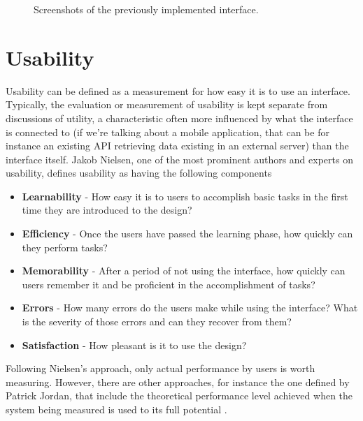 \begin{figure}[h]
\begin{center}
\leavevmode
{} \hspace{1em}%
\caption{Screenshots of the previously implemented interface.}

\label{fig:current}
\end{center}
\end{figure}

\pagebreak

\section{Usability}

Usability can be defined as a measurement for how easy it is to use an interface. Typically, the evaluation or measurement of usability is kept separate from discussions of utility, a characteristic often more influenced by what the interface is connected to (if we're talking about a mobile application, that can be for instance an existing API retrieving data existing in an external server) than the interface itself. 
Jakob Nielsen, one of the most prominent authors and experts on usability, defines usability as having the following components \cite{kn:Nie12}

\begin{itemize}
\item \textbf{Learnability} - How easy it is to users to accomplish basic tasks in the first time they are introduced to the design?
\item \textbf{Efficiency} - Once the users have passed the learning phase, how quickly can they perform tasks?
\item \textbf{Memorability} - After a period of not using the interface, how quickly can users remember it and be proficient in the accomplishment of tasks?
\item \textbf{Errors} - How many errors do the users make while using the interface? What is the severity of those errors and can they recover from them?
\item \textbf{Satisfaction} - How pleasant is it to use the design?
\end{itemize}

Following Nielsen's approach, only actual performance by users is worth measuring. However, there are other approaches, for instance the one defined by Patrick Jordan, that include the theoretical performance level achieved when the system being measured is used to its full potential \cite{kn:Jor94}.

